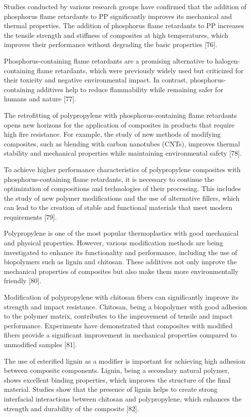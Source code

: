 \begin{multicols}{2}
Studies conducted by various research groups have confirmed that the
addition of phosphorus flame retardants to PP significantly improves its
mechanical and thermal properties. The addition of phosphorus flame
retardants to PP increases the tensile strength and stiffness of
composites at high temperatures, which improves their performance
without degrading the basic properties {[}76{]}.

Phosphorus-containing flame retardants are a promising alternative to
halogen-containing flame retardants, which were previously widely used
but criticized for their toxicity and negative environmental impact. In
contrast, phosphorus-containing additives help to reduce flammability
while remaining safer for humans and nature {[}77{]}.

The retrofitting of polypropylene with phosphorus-containing flame
retardants opens new horizons for the application of composites in
products that require high fire resistance. For example, the study of
new methods of modifying composites, such as blending with carbon
nanotubes (CNTs), improves thermal stability and mechanical properties
while maintaining environmental safety {[}78{]}.

To achieve higher performance characteristics of polypropylene
composites with phosphorus-containing flame retardants, it is necessary
to continue the optimization of compositions and technologies of their
processing. This includes the study of new polymer modifications and the
use of alternative fillers, which can lead to the creation of stable and
functional materials that meet modern requirements {[}79{]}.

Polypropylene is one of the most popular thermoplastics with good
mechanical and physical properties. However, various modification
methods are being investigated to enhance its functionality and
performance, including the use of biopolymers such as lignin and
chitosan. These additives not only improve the mechanical properties of
composites but also make them more environmentally friendly {[}80{]}.

Modification of polypropylene with chitosan fibers can significantly
improve its strength and impact resistance. Chitosan, being a biopolymer
with good adhesion to the polymer matrix, contributes to the improvement
of tensile and impact performance. Experiments have demonstrated that
composites with modified fibers provide a significant improvement in
mechanical properties compared to unmodified samples {[}81{]}.

The use of esterified lignin as a modifier is important for achieving
high adhesion between composite components. Lignin, being a secondary
natural polymer, shows excellent binding properties, which improves the
structure of the final material. Studies show that the presence of
lignin helps to create strong interfacial interactions between chitosan
and polypropylene, which enhances the strength and durability of the
composite {[}82{]}.


\end{multicols}
